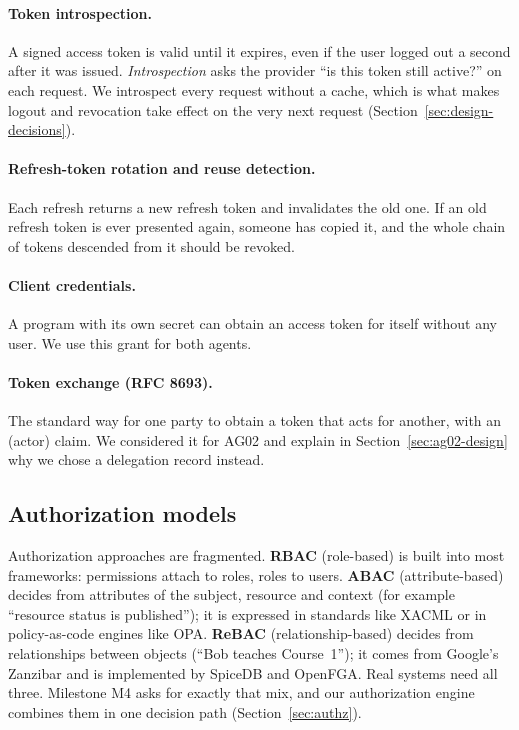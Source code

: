 \paragraph{Token introspection.} A signed access token is valid until it expires, even if the user logged out a second after it was issued. \emph{Introspection} asks the provider ``is this token still active?'' on each request. We introspect every request without a cache, which is what makes logout and revocation take effect on the very next request (Section~\ref{sec:design-decisions}).

\paragraph{Refresh-token rotation and reuse detection.} Each refresh returns a new refresh token and invalidates the old one. If an old refresh token is ever presented again, someone has copied it, and the whole chain of tokens descended from it should be revoked.

\paragraph{Client credentials.} A program with its own secret can obtain an access token for itself without any user. We use this grant for both agents.

\paragraph{Token exchange (RFC 8693).} The standard way for one party to obtain a token that acts for another, with an  (actor) claim. We considered it for AG02 and explain in Section~\ref{sec:ag02-design} why we chose a delegation record instead.

\subsection{Authorization models}
Authorization approaches are fragmented. \textbf{RBAC} (role-based) is built into most frameworks: permissions attach to roles, roles to users. \textbf{ABAC} (attribute-based) decides from attributes of the subject, resource and context (for example ``resource status is published''); it is expressed in standards like XACML or in policy-as-code engines like OPA. \textbf{ReBAC} (relationship-based) decides from relationships between objects (``Bob teaches Course~1''); it comes from Google's Zanzibar and is implemented by SpiceDB and OpenFGA. Real systems need all three. Milestone M4 asks for exactly that mix, and our authorization engine combines them in one decision path (Section~\ref{sec:authz}).


